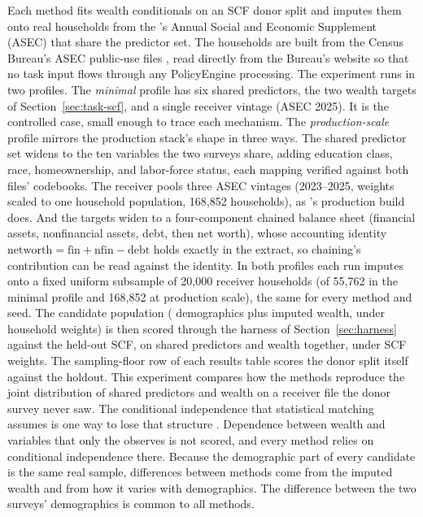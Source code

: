 Each method fits wealth conditionals on an SCF donor split and imputes them
onto real households from the \cps{}'s Annual Social and Economic Supplement
(ASEC) that share the predictor set. The households are built from the
Census Bureau's ASEC public-use files \citep{census2025}, read directly from
the Bureau's website so that no task input flows through any PolicyEngine
processing. The experiment runs in two
profiles. The \emph{minimal} profile has six shared predictors, the two
wealth targets of Section~\ref{sec:task-scf}, and a single receiver vintage
(ASEC 2025). It is the controlled case, small enough to trace each
mechanism. The \emph{production-scale} profile mirrors the production
stack's shape in three ways. The shared predictor set widens to the ten
variables the two surveys share, adding education class, race,
homeownership, and labor-force status, each mapping verified against both
files' codebooks. The receiver pools three ASEC vintages (2023--2025,
weights scaled to one household population, 168,852 households), as
\populace{}'s production build does. And the targets widen to a four-component
chained balance sheet (financial assets, nonfinancial assets, debt, then
net worth), whose accounting identity
$\text{networth} = \text{fin} + \text{nfin} - \text{debt}$ holds exactly in
the extract, so chaining's contribution can be read against the identity. In both
profiles each run imputes onto a fixed uniform subsample of 20,000 receiver
households (of 55,762 in the minimal profile and 168,852 at production
scale), the same for every method and seed. The candidate population
(\cps{} demographics plus imputed wealth, under \cps{} household weights)
is then scored through the harness of Section~\ref{sec:harness} against the
held-out SCF, on shared predictors and wealth together, under SCF
weights. The sampling-floor row of each results table scores the donor split
itself against the holdout. This
experiment compares how the methods reproduce the joint distribution of
shared predictors and wealth on a receiver file the donor survey never saw. The
conditional independence that statistical matching assumes is one way to
lose that structure \citep{rassler2002statistical, dorazio2006statistical}.
Dependence between wealth and variables that only the \cps{} observes is not
scored, and every method relies on conditional independence there. Because
the demographic part of every candidate is the same real \cps{} sample,
differences between methods come from the imputed wealth and from how it
varies with demographics. The difference between the two surveys'
demographics is common to all methods.

